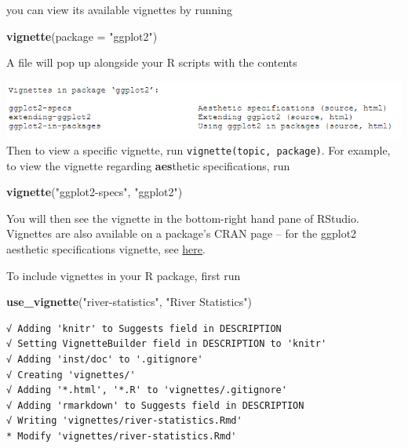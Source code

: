 \documentclass[
]{book}
\newenvironment{Shaded}{\begin{snugshade}}{\end{snugshade}}
\newcommand{\DataTypeTok}[1]{\textcolor[rgb]{0.13,0.29,0.53}{#1}}
\newcommand{\KeywordTok}[1]{\textcolor[rgb]{0.13,0.29,0.53}{\textbf{#1}}}
\newcommand{\NormalTok}[1]{#1}
\newcommand{\StringTok}[1]{\textcolor[rgb]{0.31,0.60,0.02}{#1}}
\begin{document}
you can view its available vignettes by running

\begin{Shaded}
\begin{Highlighting}[]
\KeywordTok{vignette}\NormalTok{(}\DataTypeTok{package =} \StringTok{"ggplot2"}\NormalTok{)}
\end{Highlighting}
\end{Shaded}

A file will pop up alongside your R scripts with the contents

\includegraphics[width=1\linewidth]{images/newrpack_files6}
Then to view a specific vignette, run \texttt{vignette(topic,\ package)}. For example, to view the vignette regarding \textbf{aes}thetic specifications, run

\begin{Shaded}
\begin{Highlighting}[]
\KeywordTok{vignette}\NormalTok{(}\StringTok{"ggplot2-specs"}\NormalTok{, }\StringTok{"ggplot2"}\NormalTok{)}
\end{Highlighting}
\end{Shaded}

You will then see the vignette in the bottom-right hand pane of RStudio. Vignettes are also available on a package's CRAN page -- for the ggplot2 aesthetic specifications vignette, see \href{https://cran.r-project.org/web/packages/ggplot2/vignettes/ggplot2-specs.html}{here}.

To include vignettes in your R package, first run

\begin{Shaded}
\begin{Highlighting}[]
\KeywordTok{use_vignette}\NormalTok{(}\StringTok{"river-statistics"}\NormalTok{, }\StringTok{"River Statistics"}\NormalTok{)}
\end{Highlighting}
\end{Shaded}

\begin{verbatim}
√ Adding 'knitr' to Suggests field in DESCRIPTION
√ Setting VignetteBuilder field in DESCRIPTION to 'knitr'
√ Adding 'inst/doc' to '.gitignore'
√ Creating 'vignettes/'
√ Adding '*.html', '*.R' to 'vignettes/.gitignore'
√ Adding 'rmarkdown' to Suggests field in DESCRIPTION
√ Writing 'vignettes/river-statistics.Rmd'
* Modify 'vignettes/river-statistics.Rmd'
\end{verbatim}
\end{document}
